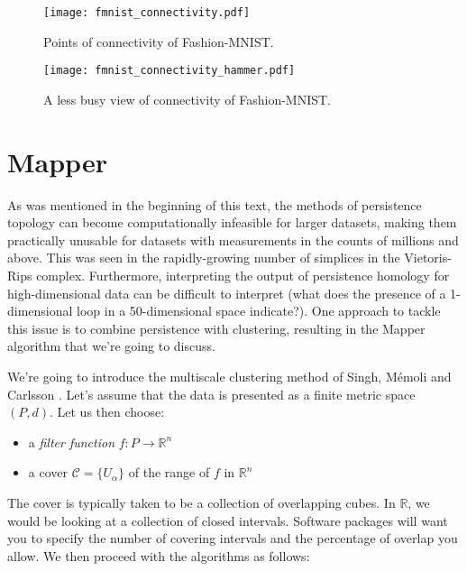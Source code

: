\begin{figure}[h!]
  \centering
  \texttt{[image: fmnist\_connectivity.pdf]}
  \caption{Points of connectivity of Fashion-MNIST.}
  \label{fig:fmnist_connectivity}
\end{figure}

\begin{figure}[h!]
  \centering
  \texttt{[image: fmnist\_connectivity\_hammer.pdf]}
  \caption{A less busy view of connectivity of Fashion-MNIST.}
  \label{fig:fmnist_connectivity_hammer}
\end{figure}

\section{Mapper}
As was mentioned in the beginning of this text, the methods of persistence topology can become computationally infeasible for larger datasets, making them practically unusable for datasets with measurements in the counts of millions and above. This was seen in the rapidly-growing number of simplices in the Vietoris-Rips complex. Furthermore, interpreting the output of persistence homology for high-dimensional data can be difficult to interpret (what does the presence of a 1-dimensional loop in a 50-dimensional space indicate?). One approach to tackle this issue is to combine persistence with clustering, resulting in the Mapper algorithm that we're going to discuss.

We're going to introduce the multiscale clustering method of Singh, Mémoli and Carlsson \cite{singh2007topological}. Let's assume that the data is presented as a finite metric space $(P, d)$. Let us then choose:

\begin{itemize}
  \item a \textit{filter function} $f: P \to \mathbb{R}^{n}$
  \item a cover $\mathcal{C} = \{U_{\alpha}\}$ of the range of $f$ in $\mathbb{R}^{n}$
\end{itemize}
The cover is typically taken to be a collection of overlapping cubes. In $\mathbb{R}$, we would be looking at a collection of closed intervals. Software packages will want you to specify the number of covering intervals and the percentage of overlap you allow. We then proceed with the algorithms as follows:

